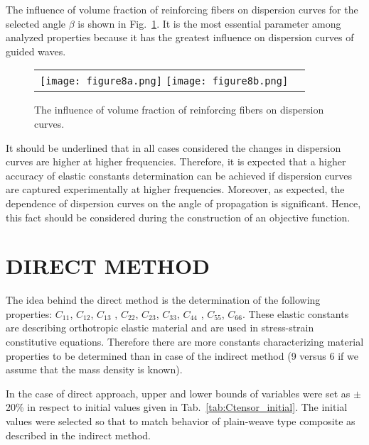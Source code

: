 \documentclass[]{spie}  %
\newcommand{\myfigscale}{0.9}
\begin{document}
The influence of volume fraction of reinforcing fibers on dispersion curves for the selected angle \(\beta\) is shown in Fig.~\ref{fig:vol}. 
It is the most essential parameter among analyzed properties because it has the greatest influence on dispersion curves of guided waves.
\begin{figure} [ht]
	\begin{center}
		\begin{tabular}{cc} %
			\texttt{[image: figure8a.png]}
			\texttt{[image: figure8b.png]}
		\end{tabular}
	\end{center}
	\caption[] 
	{ \label{fig:vol} 
		The influence of volume fraction of reinforcing fibers on dispersion curves.}
\end{figure} 

It should be underlined that in all cases considered the changes in dispersion curves are higher at higher frequencies. 
Therefore, it is expected that a higher accuracy of elastic constants determination can be achieved if dispersion curves are captured experimentally at higher frequencies. Moreover, as expected, the dependence of dispersion curves on the angle of propagation is significant. 
Hence, this fact should be considered during the construction of an objective function.

\section{DIRECT METHOD}
\label{sec:direct}

The idea behind the direct method is the determination of the following properties:
\(C_{11}\), \(C_{12}\), \(C_{13}\) , \(C_{22}\), \(C_{23}\), \(C_{33}\), \(C_{44}\) , \(C_{55}\), \(C_{66}\). These elastic constants are describing orthotropic elastic material and are used in stress-strain constitutive equations. 
Therefore there are more constants characterizing material properties to be determined than in case of the indirect method (9 versus 6 if we assume that the mass density is known).

In the case of direct approach, upper and lower bounds of variables were set as  
\(\pm\)20\% in respect to initial values given in Tab.~\ref{tab:Ctensor_initial}. 
The initial values were selected so that to match behavior of plain-weave type composite as described in the indirect method.
\end{document}
